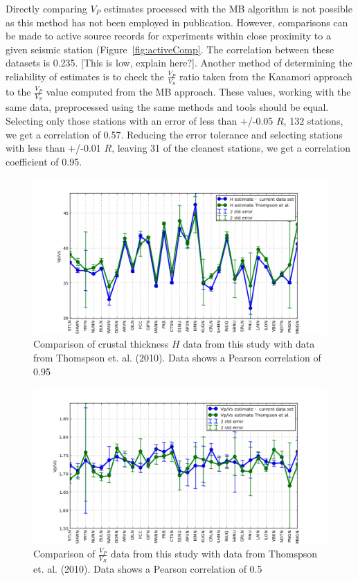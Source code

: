 \documentclass[draft, 12pt]{article}
\begin{document}
Directly comparing $V_P$ estimates processed with the MB algorithm is not possible as this method has not been employed in publication. However, comparisons can be made to active source records for experiments within close proximity to a given seismic station (Figure~\ref{fig:activeComp}. The correlation between these datasets is 0.235. [This is low, explain here?]. Another method of determining the reliability of estimates is to check the $\frac{V_P}{V_S}$ ratio taken from the Kanamori approach to the $\frac{V_P}{V_S}$ value computed from the MB approach. These values, working with the same data, preprocessed using the same methods and tools should be equal. Selecting only those stations with an error of less than +/-0.05 $R$, 132 stations, we get a correlation of 0.57. Reducing the error tolerance and selecting stations with less than +/-0.01 $R$, leaving 31 of the cleanest stations, we get a correlation coefficient of 0.95.

\begin{figure}
  \centering
    \includegraphics[width=\textwidth]{thompsonComparisonH}
  \caption{Comparison of crustal thickness $H$ data from this study with data from Thomspson et. al. (2010). Data shows a Pearson correlation of 0.95}
  \label{fig:thompsonCompH}
\end{figure}

\begin{figure}
  \centering
    \includegraphics[width=\textwidth]{thompsonComparisonR}
  \caption{Comparison of $\frac{V_P}{V_R}$ data from this study with data from Thomspson et. al. (2010). Data shows a Pearson correlation of 0.5}
  \label{fig:thompsonCompR}
\end{figure}
\end{document}
